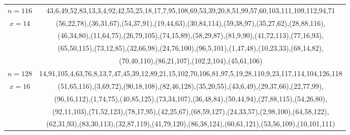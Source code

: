\begin{tabular}{| c | c |}
\hline 
\(n=116\) & 
43,6,49,52,83,13,3,4,92,42,55,25,18,17,7,95,108,69,53,39,20,8,51,99,57,60,103,111,109,112,94,71\\
\cline{2-2}
\(x=14\)
&(56,22,78),(36,31,67),(54,37,91),(19,44,63),(30,84,114),(59,38,97),(35,27,62),(28,88,116),\\
&(46,34,80),(11,64,75),(26,79,105),(74,15,89),(58,29,87),(81,9,90),(41,72,113),(77,16,93),\\
&(65,50,115),(73,12,85),(32,66,98),(24,76,100),(96,5,101),(1,47,48),(10,23,33),(68,14,82),\\
&(70,40,110),(86,21,107),(102,2,104),(45,61,106)\\
\hline 
\(n=128\) & 
14,91,105,4,63,76,8,13,7,47,45,39,12,89,21,15,102,70,106,81,97,5,19,28,110,9,23,117,114,104,126,118\\
\cline{2-2}
\(x=16\)
&(51,65,116),(3,69,72),(90,18,108),(82,46,128),(35,20,55),(43,6,49),(29,37,66),(22,77,99),\\
&(96,16,112),(1,74,75),(40,85,125),(73,34,107),(36,48,84),(50,44,94),(27,88,115),(54,26,80),\\
&(92,11,103),(71,52,123),(78,17,95),(42,25,67),(68,59,127),(24,33,57),(2,98,100),(64,58,122),\\
&(62,31,93),(83,30,113),(32,87,119),(41,79,120),(86,38,124),(60,61,121),(53,56,109),(10,101,111)\\
\hline 
\end{tabular}